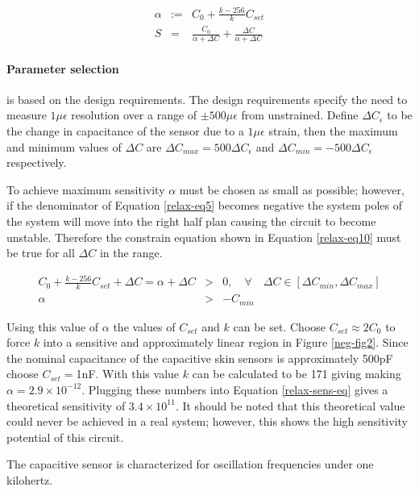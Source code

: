 \begin{eqnarray}
	\alpha&:=&C_0+\frac{k-256}{k}C_{set}\label{relax-eq9}\\
	S&=&\frac{C_0}{\alpha+\Delta C}+\frac{\Delta C}{\alpha +\Delta C}\label{relax-sens-eq}
\end{eqnarray}

\paragraph{Parameter selection} is based on the design requirements.  The design requirements specify the need to measure $1\mu\epsilon$ resolution over a range of $\pm500\mu\epsilon$ from unstrained.  Define $\Delta C_\epsilon$ to be the change in capacitance of the sensor due to a $1\mu\epsilon$ strain, then the maximum and minimum values of $\Delta C$ are $\Delta C_{max}=500\Delta C_\epsilon$ and $\Delta C_{min}=-500\Delta C_\epsilon$ respectively.

To achieve maximum sensitivity $\alpha$ must be chosen as small as possible; however, if the denominator of Equation \ref{relax-eq5} becomes negative the system poles of the system will move into the right half plan causing the circuit to become unstable.  Therefore the constrain equation shown in Equation \ref{relax-eq10} must be true for all $\Delta C$ in the range.

\begin{eqnarray}
	C_0+\frac{k-256}{k}C_{set}+\Delta C = \alpha + \Delta C &>& 0, \quad\forall\quad \Delta C\in[\Delta C_{min}, \Delta C_{max}]\label{relax-eq10}\\
	\alpha &>& -C_{min}\label{relax-eq11}
\end{eqnarray}

Using this value of $\alpha$ the values of $C_{set}$ and $k$ can be set.  Choose $C_{set}\approx 2C_0$ to force $k$ into a sensitive and approximately linear region in Figure \ref{neg-fig2}.  Since the nominal capacitance of the capacitive skin sensors is approximately 500pF choose $C_{set}=$1nF.  With this value $k$ can be calculated to be 171 giving making $\alpha=2.9\times10^{-12}$.  Plugging these numbers into Equation \ref{relax-sens-eq} gives a theoretical sensitivity of $3.4\times10^{11}$.  It should be noted that this theoretical value could never be achieved in a real system; however, this shows the high sensitivity potential of this circuit.

The capacitive sensor is characterized for oscillation frequencies under one kilohertz.  


